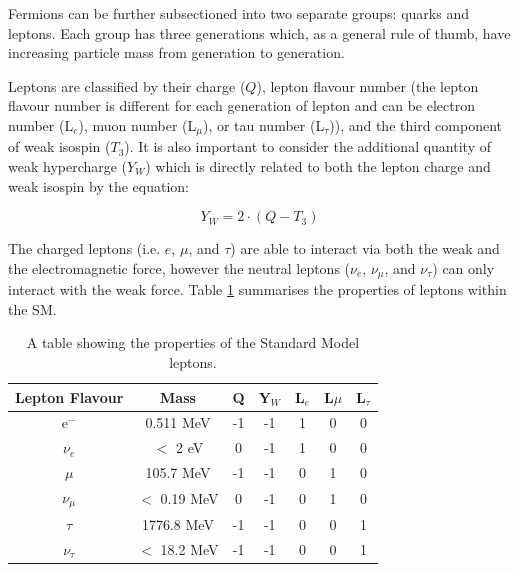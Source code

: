\documentclass[12pt,a4paper,epsf,portrait,times,epsfig]{article}
\begin{document}
Fermions can be further subsectioned into two separate groups: quarks and leptons. Each group has three generations which, as a general rule of thumb, have increasing particle mass from generation to generation. \par

Leptons are classified by their charge ($Q$), lepton flavour number (the lepton flavour number is different for each generation of lepton and can be electron number (L$_{e}$), muon number (L$_{\mu}$), or tau number (L$_{\tau}$)), and the third component of weak isospin ($T_{3}$). It is also important to consider the additional quantity of weak hypercharge ($Y_{W}$) which is directly related to both the lepton charge and weak isospin by the equation:

\begin{center}
	\begin{equation}
	Y_{W} = 2\cdot(Q-T_{3})
	\end{equation}
\end{center}

The charged leptons (i.e. $e$, $\mu$, and $\tau$) are able to interact via both the weak and the electromagnetic force, however the neutral leptons ($\nu_{e}$, $\nu_{\mu}$, and $\nu_{\tau}$) can only interact with the weak force. Table \ref{tab:SMLeptons} summarises the properties of leptons within the SM. 

\begin{table}
	\begin{center}
		\begin{tabular}{ |c|c|c|c|c|c|c| }
			\hline \hline
			Lepton Flavour & Mass & Q & Y$_{W}$ & L$_{e}$ & L${\mu}$ & L$_{\tau}$ \\
			\hline
			e$^{-}$ & 0.511 MeV & -1 & -1 & 1 & 0 & 0 \\
			\hline
			$\nu_{e}$ & $<$ 2 eV & 0 & -1 & 1 & 0 & 0 \\
			\hline
			$\mu$ & 105.7 MeV & -1 & -1 & 0 & 1 & 0 \\
			\hline
			$\nu_{\mu}$ & $<$ 0.19 MeV & 0 & -1 & 0 & 1 & 0 \\
			\hline
			$\tau$ & 1776.8 MeV & -1 & -1 & 0 & 0 & 1 \\
			\hline
			$\nu_{\tau}$ & $<$ 18.2 MeV & -1 & -1 & 0 & 0 & 1 \\
			\hline \hline
		\end{tabular}
		\caption{A table showing the properties of the Standard Model leptons\cite{Article:PDG}.}
		\label{tab:SMLeptons}
	\end{center}
\end{table}
\end{document}
